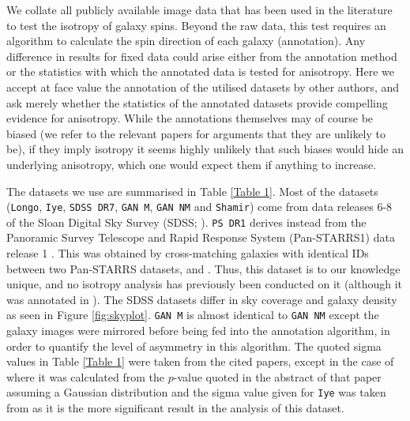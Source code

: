 \documentclass[fleqn,usenatbib,nofootinbib]{mnras}
\begin{document}
We collate all publicly available image data that has been used in the literature to test the isotropy of galaxy spins. Beyond the raw data, this test requires an algorithm to calculate the spin direction of each galaxy (annotation). Any difference in results for fixed data could arise either from the annotation method or the statistics with which the annotated data is tested for anisotropy. Here we accept at face value the annotation of the utilised datasets by other authors, and ask merely whether the statistics of the annotated datasets provide compelling evidence for anisotropy. While the annotations themselves may of course be biased (we refer to the relevant papers for arguments that they are unlikely to be), if they imply isotropy it seems highly unlikely that such biases would hide an underlying anisotropy, which one would expect them if anything to increase.

The datasets we use are summarised in Table \ref{Table 1}. Most of the datasets (\texttt{Longo}, \texttt{Iye}, \texttt{SDSS DR7}, \texttt{GAN M}, \texttt{GAN NM} and \texttt{Shamir}) come from data releases 6-8 of the Sloan Digital Sky Survey (SDSS; \citealt{SDSS, SDSS_DR8}).
\texttt{PS DR1} derives instead from the Panoramic Survey Telescope and Rapid Response System (Pan-STARRS1) data release 1 \citep{PS1}. This was obtained by cross-matching galaxies with identical IDs between two Pan-STARRS datasets, \citet{2017PASA...34...44S} and \citet{2020ApJS..251...28G}. Thus, this dataset is to our knowledge unique, and no isotropy analysis has previously been conducted on it (although it was annotated in \citealt{2017PASA...34...44S}).
The SDSS datasets differ in sky coverage and galaxy density as seen in Figure \ref{fig:skyplot}. \texttt{GAN M} is almost identical to \texttt{GAN NM} except the galaxy images were mirrored before being fed into the annotation algorithm, in order to quantify the level of asymmetry in this algorithm. The quoted sigma values in Table \ref{Table 1} were taken from the cited papers, except in the case of \citep{Longo} where it was calculated from the $p$-value quoted in the abstract of that paper assuming a Gaussian distribution and the sigma value given for \texttt{Iye} was taken from \citep{2022PASJ...74.1114S} as it is the more significant result in the analysis of this dataset.
\end{document}
